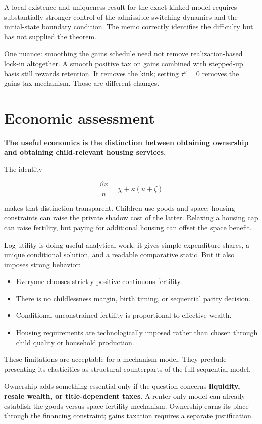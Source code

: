 \documentclass[11pt,letterpaper]{article}
\providecommand{\tightlist}{\setlength{\itemsep}{0.25em}\setlength{\parskip}{0pt}}
\begin{document}
A local existence-and-uniqueness result for the exact kinked model requires substantially
stronger control of the admissible switching dynamics and the initial-state boundary
condition. The memo correctly identifies the difficulty but has not supplied the theorem.

One nuance: smoothing the gains schedule need not remove realization-based lock-in
altogether. A smooth positive tax on gains combined with stepped-up basis still rewards
retention. It removes the kink; setting \(\tau^g=0\) removes the gains-tax mechanism.
Those are different changes.

\section{Economic assessment}\label{economic-assessment}

\textbf{The useful economics is the distinction between obtaining ownership and obtaining
child-relevant housing services.}

The identity

\[
\frac{\vartheta x}{n}
=\chi+\kappa(u+\zeta)
\]

makes that distinction transparent. Children use goods and space; housing constraints can
raise the private shadow cost of the latter. Relaxing a housing cap can raise fertility,
but paying for additional housing can offset the space benefit.

Log utility is doing useful analytical work: it gives simple expenditure shares, a unique
conditional solution, and a readable comparative static. But it also imposes strong
behavior:

\begin{itemize}
\tightlist
\item
  Everyone chooses strictly positive continuous fertility.
\item
  There is no childlessness margin, birth timing, or sequential parity decision.
\item
  Conditional unconstrained fertility is proportional to effective wealth.
\item
  Housing requirements are technologically imposed rather than chosen through child
  quality or household production.
\end{itemize}

These limitations are acceptable for a mechanism model. They preclude presenting its
elasticities as structural counterparts of the full sequential model.

Ownership adds something essential only if the question concerns \textbf{liquidity, resale
wealth, or title-dependent taxes}. A renter-only model can already establish the
goods-versus-space fertility mechanism. Ownership earns its place through the financing
constraint; gains taxation requires a separate justification.
\end{document}
